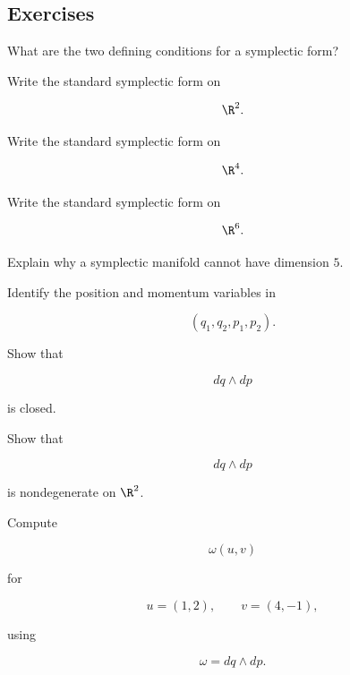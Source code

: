 \subsection{Exercises}
\label{subsec:symplectic-exercises}

\begin{exercise}[1]
What are the two defining conditions for a symplectic form?
\end{exercise}

\begin{exercise}[1]
Write the standard symplectic form on

\[
\R^2.
\]
\end{exercise}

\begin{exercise}[1]
Write the standard symplectic form on

\[
\R^4.
\]
\end{exercise}

\begin{exercise}[1]
Write the standard symplectic form on

\[
\R^6.
\]
\end{exercise}

\begin{exercise}[1]
Explain why a symplectic manifold cannot have dimension \(5\).
\end{exercise}

\begin{exercise}[1]
Identify the position and momentum variables in

\[
(q_1,q_2,p_1,p_2).
\]
\end{exercise}

\begin{exercise}[2]
Show that

\[
dq\wedge dp
\]

is closed.
\end{exercise}

\begin{exercise}[2]
Show that

\[
dq\wedge dp
\]

is nondegenerate on \(\R^2\).
\end{exercise}

\begin{exercise}[2]
Compute

\[
\omega(u,v)
\]

for

\[
u=(1,2),
\qquad
v=(4,-1),
\]

using

\[
\omega=dq\wedge dp.
\]
\end{exercise}

